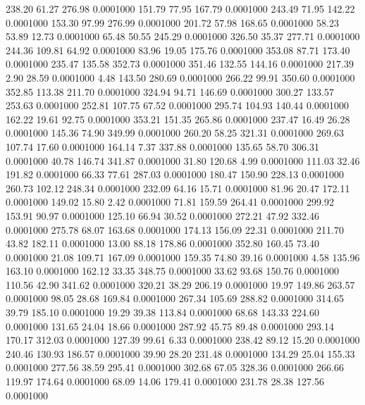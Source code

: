  238.20   61.27  276.98   0.0001000
 151.79   77.95  167.79   0.0001000
 243.49   71.95  142.22   0.0001000
 153.30   97.99  276.99   0.0001000
 201.72   57.98  168.65   0.0001000
  58.23   53.89   12.73   0.0001000
  65.48   50.55  245.29   0.0001000
 326.50   35.37  277.71   0.0001000
 244.36  109.81   64.92   0.0001000
  83.96   19.05  175.76   0.0001000
 353.08   87.71  173.40   0.0001000
 235.47  135.58  352.73   0.0001000
 351.46  132.55  144.16   0.0001000
 217.39    2.90   28.59   0.0001000
   4.48  143.50  280.69   0.0001000
 266.22   99.91  350.60   0.0001000
 352.85  113.38  211.70   0.0001000
 324.94   94.71  146.69   0.0001000
 300.27  133.57  253.63   0.0001000
 252.81  107.75   67.52   0.0001000
 295.74  104.93  140.44   0.0001000
 162.22   19.61   92.75   0.0001000
 353.21  151.35  265.86   0.0001000
 237.47   16.49   26.28   0.0001000
 145.36   74.90  349.99   0.0001000
 260.20   58.25  321.31   0.0001000
 269.63  107.74   17.60   0.0001000
 164.14    7.37  337.88   0.0001000
 135.65   58.70  306.31   0.0001000
  40.78  146.74  341.87   0.0001000
  31.80  120.68    4.99   0.0001000
 111.03   32.46  191.82   0.0001000
  66.33   77.61  287.03   0.0001000
 180.47  150.90  228.13   0.0001000
 260.73  102.12  248.34   0.0001000
 232.09   64.16   15.71   0.0001000
  81.96   20.47  172.11   0.0001000
 149.02   15.80    2.42   0.0001000
  71.81  159.59  264.41   0.0001000
 299.92  153.91   90.97   0.0001000
 125.10   66.94   30.52   0.0001000
 272.21   47.92  332.46   0.0001000
 275.78   68.07  163.68   0.0001000
 174.13  156.09   22.31   0.0001000
 211.70   43.82  182.11   0.0001000
  13.00   88.18  178.86   0.0001000
 352.80  160.45   73.40   0.0001000
  21.08  109.71  167.09   0.0001000
 159.35   74.80   39.16   0.0001000
   4.58  135.96  163.10   0.0001000
 162.12   33.35  348.75   0.0001000
  33.62   93.68  150.76   0.0001000
 110.56   42.90  341.62   0.0001000
 320.21   38.29  206.19   0.0001000
  19.97  149.86  263.57   0.0001000
  98.05   28.68  169.84   0.0001000
 267.34  105.69  288.82   0.0001000
 314.65   39.79  185.10   0.0001000
  19.29   39.38  113.84   0.0001000
  68.68  143.33  224.60   0.0001000
 131.65   24.04   18.66   0.0001000
 287.92   45.75   89.48   0.0001000
 293.14  170.17  312.03   0.0001000
 127.39   99.61    6.33   0.0001000
 238.42   89.12   15.20   0.0001000
 240.46  130.93  186.57   0.0001000
  39.90   28.20  231.48   0.0001000
 134.29   25.04  155.33   0.0001000
 277.56   38.59  295.41   0.0001000
 302.68   67.05  328.36   0.0001000
 266.66  119.97  174.64   0.0001000
  68.09   14.06  179.41   0.0001000
 231.78   28.38  127.56   0.0001000
